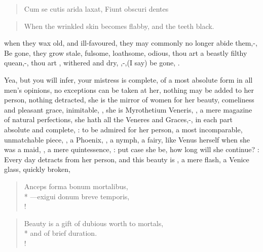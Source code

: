 \begin{latin}
\begin{verse}
Cum se cutis arida laxat,
Fiunt obscuri dentes
\end{verse}
\end{latin}
\translationrule%
\begin{verse}%
When the wrinkled skin becomes flabby,
and the teeth black.
\end{verse}%

when they wax old, and ill-favoured, they may commonly no longer abide
them,-, Be gone, they grow stale, fulsome,
loathsome, odious, thou art a beastly filthy quean,-, thou art , withered and dry, ,-,(I say) be gone, .

Yea, but you will infer, your mistress is complete, of a most absolute
form in all men's opinions, no exceptions can be taken at her, nothing
may be added to her person, nothing detracted, she is the mirror of
women for her beauty, comeliness and pleasant grace, inimitable, , she is Myrothetium Veneris, , a
mere magazine of natural perfections, she hath all the Veneres and
Graces,-, in each part absolute and
complete, : to be admired for her
person, a most incomparable, unmatchable piece, , a Phoenix, , a nymph, a fairy, like Venus herself when she
was a maid, , a mere quintessence, : put case she be, how long will she continue?
: Every day
detracts from her person, and this beauty is , a mere flash,
a Venice glass, quickly broken,

\begin{latin}
\begin{verse}%
Anceps forma bonum mortalibus,\\*
---exigui donum breve temporis,\\!
\end{verse}%
\end{latin}
\translationrule%
\begin{verse}%
Beauty is a gift of dubious worth to mortals,\\*
and of brief duration.\\!
\end{verse}%
%

